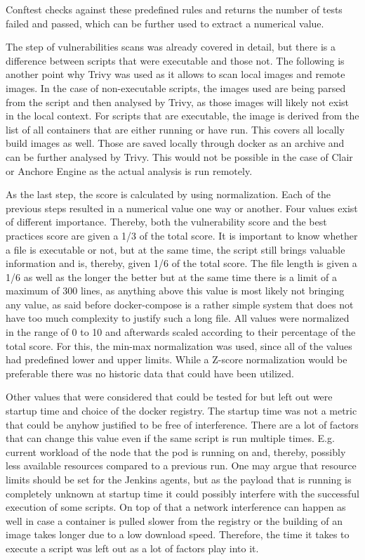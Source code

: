 Conftest checks against these predefined rules and returns the number of tests failed and passed, which can be further used to extract a numerical value.

The step of vulnerabilities scans was already covered in detail, but there is a difference between scripts that were executable and those not. The following is another point why Trivy was used as it allows to scan local images and remote images. In the case of non-executable scripts, the images used are being parsed from the script and then analysed by Trivy, as those images will likely not exist in the local context. For scripts that are executable, the image is derived from the list of all containers that are either running or have run. This covers all locally build images as well. Those are saved locally through docker as an archive and can be further analysed by Trivy. This would not be possible in the case of Clair or Anchore Engine as the actual analysis is run remotely.

As the last step, the score is calculated by using normalization. Each of the previous steps resulted in a numerical value one way or another. Four values exist of different importance. Thereby, both the vulnerability score and the best practices score are given a 1/3 of the total score. It is important to know whether a file is executable or not, but at the same time, the script still brings valuable information and is, thereby, given 1/6 of the total score. The file length is given a 1/6 as well as the longer the better but at the same time there is a limit of a maximum of 300 lines, as anything above this value is most likely not bringing any value, as said before docker-compose is a rather simple system that does not have too much complexity to justify such a long file.
All values were normalized in the range of 0 to 10 and afterwards scaled according to their percentage of the total score. For this, the min-max normalization was used, since all of the values had predefined lower and upper limits. While a Z-score normalization would be preferable there was no historic data that could have been utilized.

Other values that were considered that could be tested for but left out were startup time and choice of the docker registry.
The startup time was not a metric that could be anyhow justified to be free of interference. There are a lot of factors that can change this value even if the same script is run multiple times. E.g. current workload of the node that the pod is running on and, thereby, possibly less available resources compared to a previous run. One may argue that resource limits should be set for the Jenkins agents, but as the payload that is running is completely unknown at startup time it could possibly interfere with the successful execution of some scripts. On top of that a network interference can happen as well in case a container is pulled slower from the registry or the building of an image takes longer due to a low download speed. Therefore, the time it takes to execute a script was left out as a lot of factors play into it.

